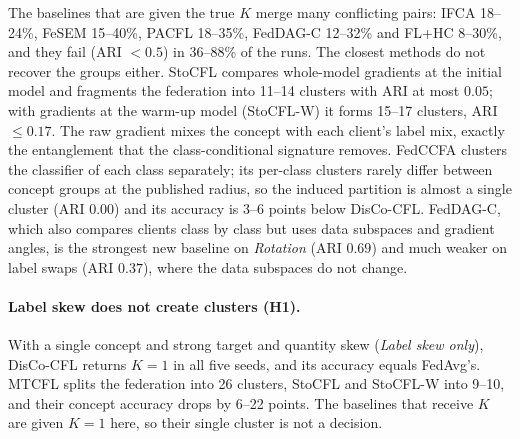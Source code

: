 The baselines that are given the true $K$ merge many conflicting pairs: IFCA 18--24\%, FeSEM 15--40\%, PACFL 18--35\%, FedDAG-C 12--32\% and FL+HC 8--30\%, and they fail (ARI $<0.5$) in 36--88\% of the runs. The closest methods do not recover the groups either. StoCFL compares whole-model gradients at the initial model and fragments the federation into 11--14 clusters with ARI at most $0.05$; with gradients at the warm-up model (StoCFL-W) it forms 15--17 clusters, ARI $\le0.17$. The raw gradient mixes the concept with each client's label mix, exactly the entanglement that the class-conditional signature removes. FedCCFA clusters the classifier of each class separately; its per-class clusters rarely differ between concept groups at the published radius, so the induced partition is almost a single cluster (ARI $0.00$) and its accuracy is 3--6 points below DisCo-CFL. FedDAG-C, which also compares clients class by class but uses data subspaces and gradient angles, is the strongest new baseline on \emph{Rotation} (ARI $0.69$) and much weaker on label swaps (ARI $0.37$), where the data subspaces do not change.

\paragraph{Label skew does not create clusters (H1).} With a single concept and strong target and quantity skew (\emph{Label skew only}), DisCo-CFL returns $K=1$ in all five seeds, and its accuracy equals FedAvg's. MTCFL splits the federation into 26 clusters, StoCFL and StoCFL-W into 9--10, and their concept accuracy drops by 6--22 points. The baselines that receive $K$ are given $K=1$ here, so their single cluster is not a decision.

